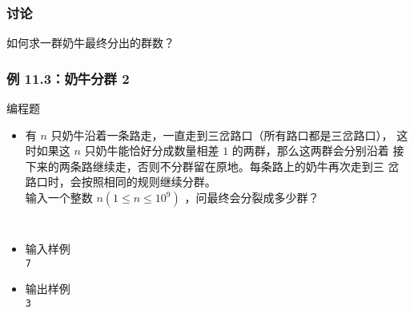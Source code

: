 \begin{frame}[fragile]
    \frametitle{讨论}

    \begin{block}{}
        \vspace{.5cm}
        \begin{center}
            {\Large 如何求一群奶牛最终分出的群数？}
        \end{center}
        \vspace{.5cm}
    \end{block}
\end{frame}

\begin{frame}[fragile]
    \frametitle{例 11.3：奶牛分群 2}

    \begin{exampleblock}{编程题}
        \begin{itemize}
            \item 有 $n$ 只奶牛沿着一条路走，一直走到三岔路口（所有路口都是三岔路口），
            这时如果这 $n$ 只奶牛能恰好分成数量相差 $1$ 的两群，那么这两群会分别沿着
            接下来的两条路继续走，否则不分群留在原地。每条路上的奶牛再次走到三
            岔路口时，会按照相同的规则继续分群。\\
	        输入一个整数 $n(1 \le n \le 10^9)$ ，问最终会分裂成多少群？
        \end{itemize}

        \begin{columns}
            \begin{itemize}
                \item 输入样例 \\
                    \lstinline|7|
                \item 输出样例 \\
                    \lstinline|3|
            \end{itemize}

            \begin{tikzpicture}[node distance=0.5cm and 0cm, %
                every node/.style={rectangle, draw, rounded corners, align=center, minimum width=1cm, minimum height=0.5cm}  %
            ]
    

\end{tikzpicture}
\end{columns}
\end{exampleblock}
\end{frame}
